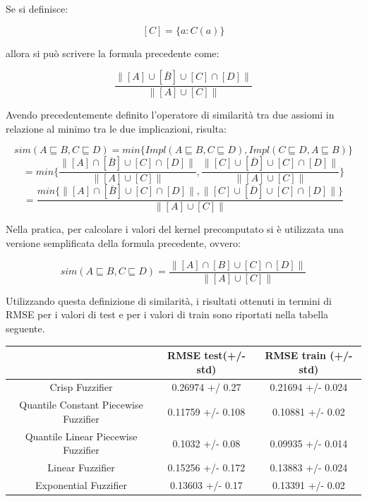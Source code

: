 \documentclass[12pt,a4paper]{report}
\begin{document}
Se si definisce: 

\[ [C] = \{a : C(a) \}\]

allora si può scrivere la formula precedente come:

\[ \frac{\parallel [A] \cup [\overline{B}] \cup [C] \cap [D] \parallel}{\parallel [A] \cup [C] \parallel}\]

Avendo precedentemente definito l'operatore di similarità tra due assiomi in relazione al minimo tra le due implicazioni, risulta:

\[ sim(A \sqsubseteq B, C  \sqsubseteq D) = min\{Impl(A \sqsubseteq B, C\sqsubseteq D), Impl( C\sqsubseteq D, A \sqsubseteq B)\} \]
\[ = min\bigg\{\frac{\parallel [A] \cap [\overline{B}] \cup [C] \cap [D] \parallel}{\parallel [A] \cup [C] \parallel}, \frac{\parallel [C] \cup [\overline{D}] \cup [C] \cap [D] \parallel}{\parallel [A] \cup [C] \parallel}\bigg\}\]
\[ = \frac{min\{\parallel [A] \cap [\overline{B}] \cup [C] \cap [D] \parallel, \parallel [C] \cup [\overline{D}] \cup [C] \cap [D] \parallel\}}{\parallel [A] \cup [C] \parallel}\]

Nella pratica, per calcolare i valori del kernel precomputato si è utilizzata una versione semplificata della formula precedente, ovvero:

\[sim(A \sqsubseteq B, C  \sqsubseteq D) = \frac{\parallel [A] \cap [B] \cup [C] \cap [D] \parallel}{\parallel [A] \cup [C] \parallel} \]

Utilizzando questa definizione di similarità, i risultati ottenuti in termini di RMSE per i valori di test e per i valori di train sono riportati nella tabella seguente.

\begin{table}[h!]
\small
\centering 	
	\begin{tabular}{|c|c|c|}
	 \hline
	  & RMSE test(+/- std) & RMSE train (+/- std)\\ [0.5ex] 
	 \hline
	 Crisp Fuzzifier & 0.26974 +/ 0.27 & 0.21694 +/- 0.024 \\ 
	 \hline
	 Quantile Constant Piecewise Fuzzifier & 0.11759 +/- 0.108 & 0.10881 +/- 0.02\\
	 \hline
	 Quantile Linear Piecewise Fuzzifier & 0.1032 +/- 0.08 & 0.09935 +/- 0.014\\
	 \hline
	 Linear Fuzzifier & 0.15256 +/- 0.172 & 0.13883 +/- 0.024\\
	 \hline
	 Exponential Fuzzifier & 0.13603 +/- 0.17 & 0.13391 +/- 0.02\\ [1ex] 
	 \hline
	\end{tabular}
\end{table}
\end{document}
